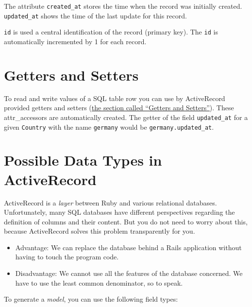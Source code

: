 \documentclass[a4paper]{book}
\newcounter{tab}[chapter]
\begin{document}
The attribute \texttt{created\_at} stores the time when the record was initially created. \texttt{updated\_at} shows the time of the last update for this record.

\texttt{id} is used a central identification of the record (primary key). The \texttt{id} is automatically incremented by 1 for each record.

\section{Getters and Setters}\label{getters-and-setters-1}

To read and write values of a SQL table row you can use by ActiveRecord provided getters and setters (\hyperref[rubyux5fgetterux5fandux5fsetter]{the section called “Getters and Setters”}). These attr\_accessors are automatically created. The getter of the field \texttt{updated\_at} for a given \texttt{Country} with the name \texttt{germany} would be \texttt{germany.updated\_at}.

\section{Possible Data Types in ActiveRecord}\label{possible-data-types-in-activerecord}

ActiveRecord is a \emph{layer} between Ruby and various relational databases. Unfortunately, many SQL databases have different perspectives regarding the definition of columns and their content. But you do not need to worry about this, because ActiveRecord solves this problem transparently for you.

\begin{itemize}
\itemsep1pt\parskip0pt
\item
  Advantage: We can replace the database behind a Rails application without having to touch the program code.
\item
  Disadvantage: We cannot use all the features of the database concerned. We have to use the least common denominator, so to speak.
\end{itemize}

To generate a \emph{model}, you can use the following field types:
\end{document}
